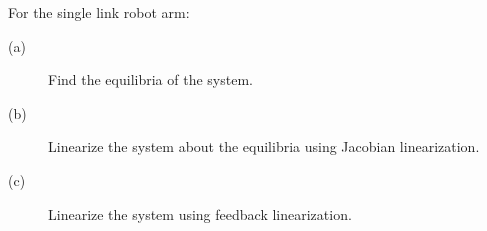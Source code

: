 For the single link robot arm:
    \begin{description}
    \item[(a)] Find the equilibria of the system.
    \item[(b)] Linearize the system about the equilibria using Jacobian linearization.
    \item[(c)] Linearize the system using feedback linearization.
    \end{description}